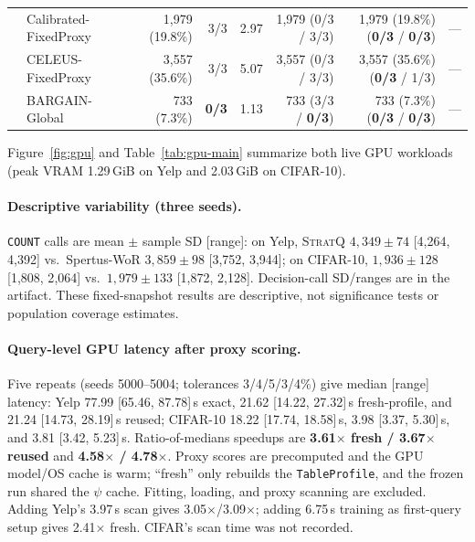 \begin{table}[t]
\begin{tabular}{@{}llrrrrrr@{}}
& Calibrated-FixedProxy & 1,979 (19.8\%) & 3/3 & 2.97 & 1,979 (0/3 / 3/3) & 1,979 (19.8\%) (\textbf{0/3} / \textbf{0/3}) & --- \\
& CELEUS-FixedProxy~\cite{zhou2026celeus} & 3,557 (35.6\%) & 3/3 & 5.07 & 3,557 (0/3 / 3/3) & 3,557 (35.6\%) (\textbf{0/3} / 1/3) & --- \\
& BARGAIN-Global~\cite{zeighami2026bargain} & 733 (7.3\%) & \textbf{0/3} & 1.13 & 733 (3/3 / \textbf{0/3}) & 733 (7.3\%) (\textbf{0/3} / \textbf{0/3}) & --- \\
\bottomrule
\end{tabular}
\end{table}

Figure~\ref{fig:gpu} and Table~\ref{tab:gpu-main} summarize both live GPU workloads (peak VRAM 1.29\,GiB on Yelp and 2.03\,GiB on CIFAR-10).

\paragraph{Descriptive variability (three seeds).}
\texttt{COUNT} calls are mean $\pm$ sample SD [range]: on Yelp, \textsc{StratQ} $4{,}349\pm74$ [4{,}264, 4{,}392] vs.\ Spertus-WoR $3{,}859\pm98$ [3{,}752, 3{,}944]; on CIFAR-10, $1{,}936\pm128$ [1{,}808, 2{,}064] vs.\ $1{,}979\pm133$ [1{,}872, 2{,}128]. Decision-call SD/ranges are in the artifact. These fixed-snapshot results are descriptive, not significance tests or population coverage estimates.

\paragraph{Query-level GPU latency after proxy scoring.}
Five repeats (seeds 5000--5004; tolerances 3/4/5/3/4\%) give median [range] latency: Yelp 77.99 [65.46, 87.78]\,s exact, 21.62 [14.22, 27.32]\,s fresh-profile, and 21.24 [14.73, 28.19]\,s reused; CIFAR-10 18.22 [17.74, 18.58]\,s, 3.98 [3.37, 5.30]\,s, and 3.81 [3.42, 5.23]\,s. Ratio-of-medians speedups are \textbf{3.61$\times$ fresh / 3.67$\times$ reused} and \textbf{4.58$\times$ / 4.78$\times$}. Proxy scores are precomputed and the GPU model/OS cache is warm; ``fresh'' only rebuilds the \texttt{TableProfile}, and the frozen run shared the $\psi$ cache. Fitting, loading, and proxy scanning are excluded. Adding Yelp's 3.97\,s scan gives 3.05$\times$/3.09$\times$; adding 6.75\,s training as first-query setup gives 2.41$\times$ fresh. CIFAR's scan time was not recorded.

